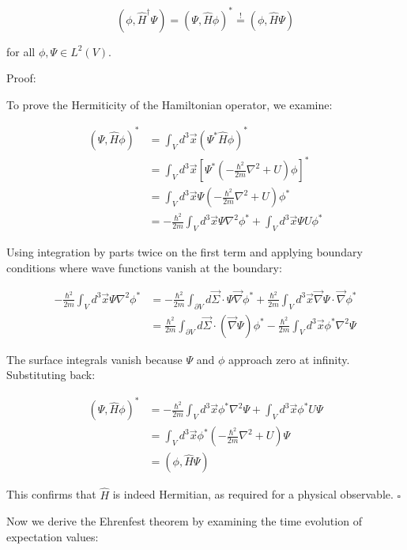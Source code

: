 \documentclass[italian]{HKNdocument}
\begin{document}
\begin{equation*}
(\phi, \hat{H}^\dagger\Psi) = (\Psi, \hat{H}\phi)^* \stackrel{!}{=} (\phi, \hat{H}\Psi) \tag{1.82}
\end{equation*}

for all $\phi, \Psi \in L^2(V)$.

Proof:


To prove the Hermiticity of the Hamiltonian operator, we examine:

\begin{align*}
(\Psi, \hat{H}\phi)^* &= \int_V d^3\vec{x}(\Psi^*\hat{H}\phi)^* \\
&= \int_V d^3\vec{x}\left[\Psi^*\left(-\frac{\hbar^2}{2m}\nabla^2 + U\right)\phi\right]^* \\
&= \int_V d^3\vec{x}\Psi\left(-\frac{\hbar^2}{2m}\nabla^2 + U\right)\phi^* \tag{1.83} \\
&= -\frac{\hbar^2}{2m}\int_V d^3\vec{x}\Psi\nabla^2\phi^* + \int_V d^3\vec{x}\Psi U\phi^*
\end{align*}

Using integration by parts twice on the first term and applying boundary conditions where wave functions vanish at the boundary:

\begin{align*}
-\frac{\hbar^2}{2m}\int_V d^3\vec{x}\Psi\nabla^2\phi^* &= -\frac{\hbar^2}{2m}\int_{\partial V}d\vec{\Sigma}\cdot\Psi\vec{\nabla}\phi^* + \frac{\hbar^2}{2m}\int_V d^3\vec{x}\vec{\nabla}\Psi\cdot\vec{\nabla}\phi^* \tag{1.84} \\
&= \frac{\hbar^2}{2m}\int_{\partial V}d\vec{\Sigma}\cdot(\vec{\nabla}\Psi)\phi^* - \frac{\hbar^2}{2m}\int_V d^3\vec{x}\phi^*\nabla^2\Psi
\end{align*}

The surface integrals vanish because $\Psi$ and $\phi$ approach zero at infinity. Substituting back:

\begin{align*}
(\Psi, \hat{H}\phi)^* &= -\frac{\hbar^2}{2m}\int_V d^3\vec{x}\phi^*\nabla^2\Psi + \int_V d^3\vec{x}\phi^*U\Psi \\
&= \int_V d^3\vec{x}\phi^*\left(-\frac{\hbar^2}{2m}\nabla^2 + U\right)\Psi \\
&= (\phi, \hat{H}\Psi) \tag{1.85}
\end{align*}

This confirms that $\hat{H}$ is indeed Hermitian, as required for a physical observable. $\square$

Now we derive the Ehrenfest theorem by examining the time evolution of expectation values:
\end{document}
